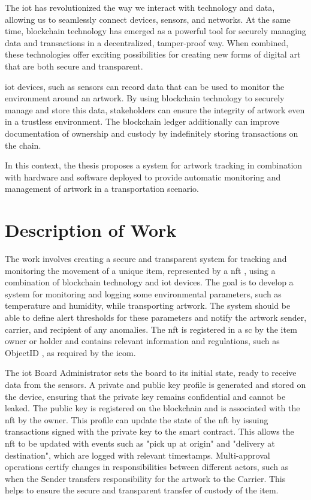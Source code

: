 The \gls{iot} has revolutionized the way we interact with technology and data, allowing us to seamlessly connect devices, sensors, and networks. At the same time, blockchain technology has emerged as a powerful tool for securely managing data and transactions in a decentralized, tamper-proof way. When combined, these technologies offer exciting possibilities for creating new forms of digital art that are both secure and transparent.

\gls{iot} devices, such as sensors can record data that can be used to monitor the environment around an artwork. By using blockchain technology to securely manage and store this data, stakeholders can ensure the integrity of artwork even in a trustless environment. The blockchain ledger additionally can improve documentation of ownership and custody by indefinitely storing transactions on the chain.

In this context, the thesis proposes a system for artwork tracking in combination with hardware and software deployed to provide automatic monitoring and management of artwork in a transportation scenario.

\section{Description of Work}
The work involves creating a secure and transparent system for tracking and monitoring the movement of a unique item, represented by a \gls{nft} \cite{nftminter}, using a combination of blockchain technology and \gls{iot} devices. The goal is to develop a system for monitoring and logging some environmental parameters, such as temperature and humidity, while transporting artwork. The system should be able to define alert thresholds for these parameters and notify the artwork sender, carrier, and recipient of any anomalies. The \gls{nft} is registered in a \gls{sc} by the item owner or holder and contains relevant information and regulations, such as ObjectID \cite{objectid}, as required by the \gls{icom}.

The \gls{iot} Board Administrator sets the board to its initial state, ready to receive data from the sensors. A private and public key profile is generated and stored on the device, ensuring that the private key remains confidential and cannot be leaked. The public key is registered on the blockchain and is associated with the \gls{nft} by the owner. This profile can update the state of the \gls{nft} by issuing transactions signed with the private key to the smart contract. This allows the \gls{nft} to be updated with events such as "pick up at origin" and "delivery at destination", which are logged with relevant timestamps. 
Multi-approval operations certify changes in responsibilities between different actors, such as when the Sender transfers responsibility for the artwork to the Carrier. This helps to ensure the secure and transparent transfer of custody of the item. 


